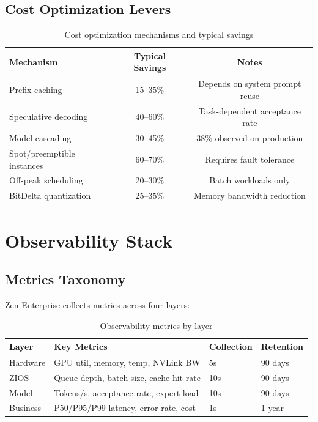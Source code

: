 \documentclass[11pt,a4paper]{article}
\begin{document}
\subsection{Cost Optimization Levers}

\begin{table}[H]
\centering
\caption{Cost optimization mechanisms and typical savings}
\label{tab:savings}
\begin{tabular}{lcc}
\toprule
Mechanism & Typical Savings & Notes \\
\midrule
Prefix caching & 15--35\% & Depends on system prompt reuse \\
Speculative decoding & 40--60\% & Task-dependent acceptance rate \\
Model cascading & 30--45\% & 38\% observed on production \\
Spot/preemptible instances & 60--70\% & Requires fault tolerance \\
Off-peak scheduling & 20--30\% & Batch workloads only \\
BitDelta quantization & 25--35\% & Memory bandwidth reduction \\
\bottomrule
\end{tabular}
\end{table}

\section{Observability Stack}

\subsection{Metrics Taxonomy}

Zen Enterprise collects metrics across four layers:

\begin{table}[H]
\centering
\caption{Observability metrics by layer}
\label{tab:metrics}
\begin{tabular}{llll}
\toprule
Layer & Key Metrics & Collection & Retention \\
\midrule
Hardware & GPU util, memory, temp, NVLink BW & 5s & 90 days \\
ZIOS & Queue depth, batch size, cache hit rate & 10s & 90 days \\
Model & Tokens/s, acceptance rate, expert load & 10s & 90 days \\
Business & P50/P95/P99 latency, error rate, cost & 1s & 1 year \\
\bottomrule
\end{tabular}
\end{table}
\end{document}
